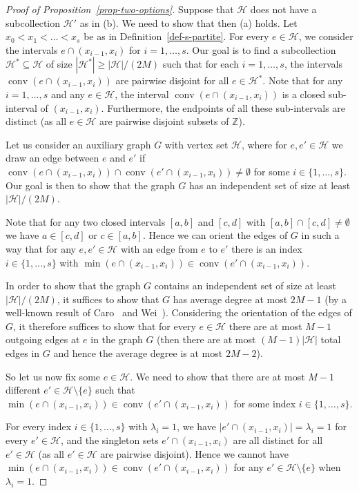 \documentclass{aic}
\theoremstyle{definition}
\numberwithin{equation}{section}
\numberwithin{figure}{section}
\newcommand{\su}{\subseteq}
\newcommand{\sm}{\setminus}
\newcommand{\Z}{\mathbb{Z}}
\newcommand{\HH}{\mathcal{H}}
\newcommand{\conv}{\operatorname{conv}}
\begin{document}
\begin{proof}[Proof of Proposition~\ref{prop-two-options}]
Suppose that $\HH$ does not have a subcollection $\HH'$ as in (b). We need to show that then (a) holds. Let $x_0<x_1<\dots<x_s$ be as in Definition~\ref{def-s-partite}. For every $e\in \HH$, we consider the intervals $e\cap (x_{i-1},x_i)$ for $i=1,\dots,s$. Our goal is to find a subcollection $\HH^*\su \HH$ of size $|\HH^*|\ge |\HH|/(2M)$ such that for each $i=1,\dots,s$, the intervals $\conv(e\cap (x_{i-1},x_i))$ are pairwise disjoint for all $e\in \HH^*$. Note that for any $i=1,\dots,s$ and any $e\in \HH$, the interval $\conv(e\cap (x_{i-1},x_i))$ is a closed sub-interval of $(x_{i-1},x_i)$. Furthermore, the endpoints of all these sub-intervals are distinct (as all $e\in \HH$ are pairwise disjoint subsets of $\Z$).

Let us consider an auxiliary graph $G$ with vertex set $\HH$, where for $e,e'\in\HH$ we draw an edge between $e$ and $e'$ if $\conv(e\cap (x_{i-1},x_i))\cap \conv(e'\cap (x_{i-1},x_i))\ne \emptyset$ for some $i\in\{1,\dots,s\}$. Our goal is then to show that the graph $G$ has an independent set of size at least $|\HH|/(2M)$.

Note that for any two closed intervals $[a,b]$ and $[c,d]$ with $[a,b]\cap [c,d]\ne \emptyset$ we have $a\in [c,d]$ or $c\in [a,b]$. Hence we can orient the edges of $G$ in such a way that for any $e,e'\in\HH$ with an edge from $e$ to $e'$ there is an index $i\in\{1,\dots,s\}$ with $\min(e\cap (x_{i-1},x_i))\in \conv(e'\cap (x_{i-1},x_i))$.

In order to show that the graph $G$ contains an independent set of size at least $|\HH|/(2M)$, it suffices to show that $G$ has average degree at most $2M-1$ (by a well-known result of Caro~\cite{Caro} and Wei~\cite{Wei}). Considering the orientation of the edges of $G$, it therefore suffices to show that for every $e\in \HH$ there are at most $M-1$ outgoing edges at $e$ in the graph $G$ (then there are at most $(M-1)|\HH|$ total edges in $G$ and hence the average degree is at most $2M-2$).

So let us now fix some $e\in \HH$. We need to show that there are at most $M-1$ different $e'\in\HH\sm\{e\}$ such that $\min(e\cap (x_{i-1},x_i))\in \conv(e'\cap (x_{i-1},x_i))$ for some index $i\in\{1,\dots,s\}$. 

For every index $i\in\{1,\dots,s\}$ with $\lambda_i=1$, we have $|e'\cap (x_{i-1},x_i)|=\lambda_i=1$ for every $e'\in \HH$, and the singleton sets $e'\cap (x_{i-1},x_i)$ are all distinct for all $e'\in \HH$ (as all $e'\in \HH$ are pairwise disjoint). Hence we cannot have $\min(e\cap (x_{i-1},x_i))\in \conv(e'\cap (x_{i-1},x_i))$ for any $e'\in \HH\sm\{e\}$ when $\lambda_i=1$.


\end{proof}
\end{document}
